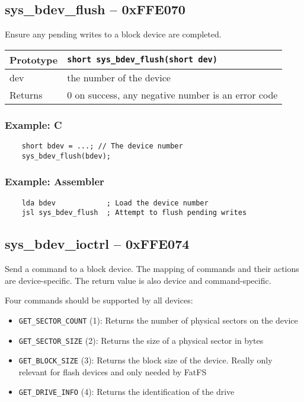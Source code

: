 \subsection*{sys\_bdev\_flush -- 0xFFE070}
Ensure any pending writes to a block device are completed.

\bigskip

\begin{tabular}{|l||l|} \hline
Prototype & \lstinline!short sys_bdev_flush(short dev)! \\ \hline
dev & the number of the device \\ \hline
Returns & 0 on success, any negative number is an error code \\ \hline
\end{tabular}

\subsubsection*{Example: C}
\begin{lstlisting}
    short bdev = ...; // The device number
    sys_bdev_flush(bdev);
\end{lstlisting}

\subsubsection*{Example: Assembler}
\begin{verbatim}
    lda bdev            ; Load the device number
    jsl sys_bdev_flush  ; Attempt to flush pending writes
\end{verbatim}

\subsection*{sys\_bdev\_ioctrl -- 0xFFE074}
Send a command to a block device. The mapping of commands and their actions are device-specific. The return value is also device and command-specific.

Four commands should be supported by all devices:
\begin{itemize}
    \item \verb+GET_SECTOR_COUNT+ (1): Returns the number of physical sectors on the device
    \item \verb+GET_SECTOR_SIZE+ (2): Returns the size of a physical sector in bytes
    \item \verb+GET_BLOCK_SIZE+ (3): Returns the block size of the device. Really only relevant for flash devices and only needed by FatFS
    \item \verb+GET_DRIVE_INFO+ (4): Returns the identification of the drive
\end{itemize}

